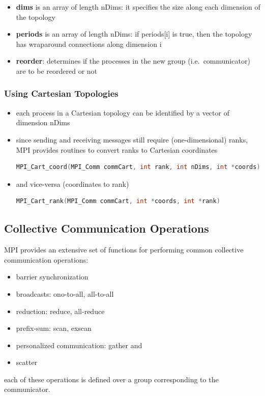\begin{itemize}
\tightlist
\item
  \textbf{dims} is an array of length nDims: it specifies the size along
  each dimension of the topology
\item
  \textbf{periods} is an array of length nDims: if periods{[}i{]} is true,
  then the topology has wraparound connections along dimension i
\item
  \textbf{reorder}: determines if the processes in the new group
  (i.e.~communicator) are to be reordered or not
\end{itemize}

\hypertarget{using-cartesian-topologies}{%
\subsubsection{Using Cartesian
Topologies}\label{using-cartesian-topologies}}

\begin{itemize}
\tightlist
\item
  each process in a Cartesian topology can be identified by a vector of
  dimension nDims
\item
  since sending and receiving messages still require (one-dimensional)
  ranks, MPI provides routines to convert ranks to Cartesian coordinates

\begin{lstlisting}[language=C++]
MPI_Cart_coord(MPI_Comm commCart, int rank, int nDims, int *coords)
\end{lstlisting}

\item
  and vice-versa (coordinates to rank)

\begin{lstlisting}[language=C++]
MPI_Cart_rank(MPI_Comm commCart, int *coords, int *rank)
\end{lstlisting}
\end{itemize}

\hypertarget{collective-communication-operations}{%
\subsection{Collective Communication
Operations}\label{collective-communication-operations}}

MPI provides an extensive set of functions for performing common
collective communication operations:

\begin{itemize}
\tightlist
\item
  barrier synchronization
\item
  broadcasts: ono-to-all, all-to-all
\item
  reduction: reduce, all-reduce
\item
  prefix-sum: scan, exscan
\item
  personalized communication: gather and
\item
  scatter
\end{itemize}

each of these operations is defined over a group corresponding to the
communicator.

\clearpage
